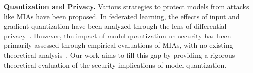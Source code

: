 \textbf{Quantization and Privacy.} Various strategies to protect models from attacks like MIAs have been proposed. In federated learning, the effects of input and gradient quantization have been analyzed through the lens of differential privacy~\cite{youn2023randomizedquantizationneeddifferential, yan_killing_2024, pmlr-v180-chaudhuri22a}. However, the impact of model quantization on security has been primarily assessed through empirical evaluations of MIAs, with no existing theoretical analysis~\cite{kowalski_towards_2022, s23187722}. Our work aims to fill this gap by providing a rigorous theoretical evaluation of the security implications of model quantization.